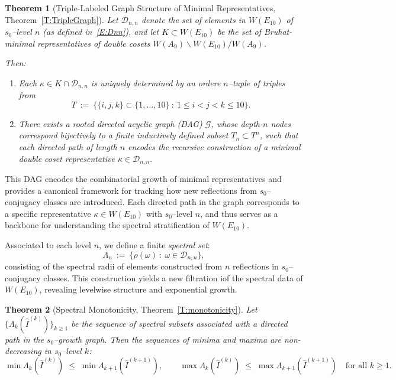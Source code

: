 \documentclass[11pt]{amsart}
\numberwithin{equation}{section}
\newtheorem*{thmm}{Theorem}
\begin{document}
\begin{thmm}[Triple-Labeled Graph Structure of Minimal Representatives, Theorem~\ref{T:TripleGraph}]
Let $\mathcal{D}_{n,n}$ denote the set of elements in $W(E_{10})$ of $s_0$--level $n$ (as defined in~\eqref{E:Dnn}), and let $K \subset W(E_{10})$ be the set of Bruhat-minimal representatives of double cosets \(W(A_9)\backslash W(E_{10})/W(A_9)\).

Then:
\begin{enumerate}
\item Each $\kappa \in K \cap \mathcal{D}_{n,n}$ is uniquely determined by an ordere $n$--tuple of triples from
 \[T\ :=\ \{\{i,j,k\} \subset \{1,\dots, 10\} \ :\ 1\le i<j<k \le 10\}.\]
\item There exists a rooted directed acyclic graph (DAG) $\mathcal{G}$, whose depth-$n$ nodes correspond bijectively to a finite inductively defined subset $T_n \subset T^n$, such that each directed path of length $n$ encodes the recursive construction of a minimal double coset representative $\kappa \in \mathcal{D}_{n,n}.$
\end{enumerate}
\end{thmm}


\medskip
This DAG encodes the combinatorial growth of minimal representatives and provides a canonical framework for tracking how new reflections from $s_0$--conjugacy classes are introduced. Each directed path in the graph corresponds to a specific representative $\kappa \in W(E_{10})$ with $s_0$--level $n$, and thus serves as a backbone for understanding the spectral stratification of $W(E_{10})$.

%
%

\medskip
Associated to each level $n$, we define a finite \emph{spectral set}:
\[ \Lambda_n\ :=\ \{ \rho(\omega) \ :\  \omega \in \mathcal{D}_{n,n}\},\] consisting of the spectral radii of elements constructed from $n$ reflections in $s_0$--conjugacy classes. This construction yields a new filtration iof the spectral data of $W(E_{10})$, revealing levelwise structure and exponential growth. 
\medskip

\begin{thmm}[Spectral Monotonicity, Theorem~\ref{T:monotonicity}]
Let $\{\Lambda_k(\widehat I^{(k)})\}_{k\ge1}$ be the sequence of
spectral subsets associated with a directed path in the
$s_0$--growth graph. Then the sequences of minima and maxima are non-decreasing in $s_0$--level $k$:
\[
\min \Lambda_k(\widehat I^{(k)})\;\le\;
\min \Lambda_{k+1}(\widehat I^{(k+1)}), \qquad
\max \Lambda_k(\widehat I^{(k)})\;\le\;
\max \Lambda_{k+1}(\widehat I^{(k+1)})
\quad \text{for all } k \ge 1.
\]
\end{thmm}
\end{document}
